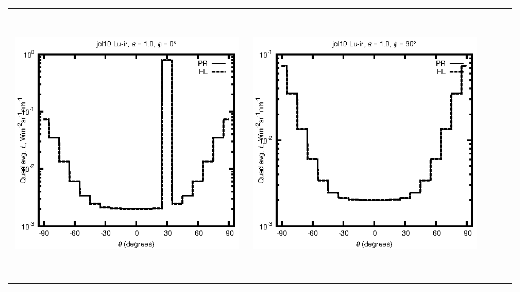 \begin{tabular}{c c c c}
\includegraphics[height=7cm]{../eps/jol10_Lu_ir_fwd.eps} &
\includegraphics[height=7cm]{../eps/jol10_Lu_ir_cross.eps} \\
\end{tabular}
